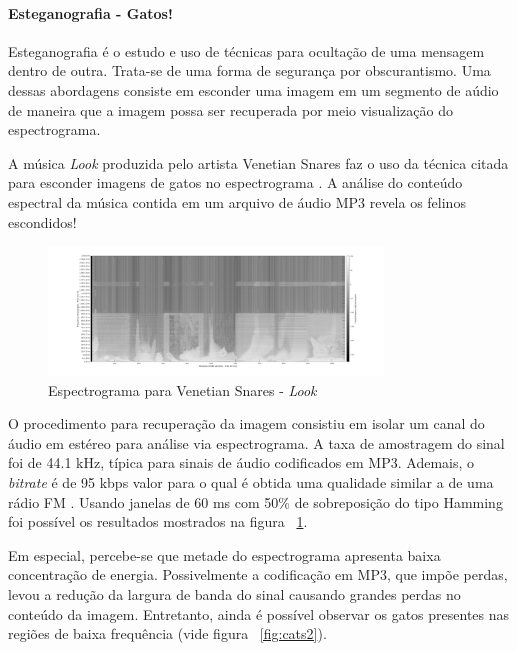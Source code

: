 \documentclass{article}
\begin{document}
\paragraph*{Esteganografia - Gatos!}
Esteganografia é o estudo e uso de técnicas para ocultação de uma mensagem dentro de outra. Trata-se de uma forma de segurança por obscurantismo. Uma dessas abordagens consiste em esconder uma imagem em um segmento de aúdio de maneira que a imagem possa ser recuperada por meio visualização do espectrograma.

A música \textit{Look} produzida pelo artista Venetian Snares faz o uso da técnica citada para esconder imagens de gatos no espectrograma \cite{ref:cats}. A análise do conteúdo espectral da música contida em um arquivo de áudio MP3 revela os felinos escondidos!
\begin{figure}[H]
	\begin{center}
		\includegraphics[width=3.5in]{Figures/cats.png}
		\caption{Espectrograma para Venetian Snares - \textit{Look}}
		\label{fig:cats}
	\end{center}
\end{figure}  

O procedimento para recuperação da imagem consistiu em isolar um canal do áudio em estéreo para análise via espectrograma. A taxa de amostragem do sinal foi de 44.1 kHz, típica para sinais de áudio codificados em MP3. Ademais, o \textit{bitrate} é de 95 kbps valor para o qual é obtida uma qualidade similar a de uma rádio FM \cite{ref:sayood}. Usando janelas de 60 ms com 50\% de sobreposição do tipo Hamming foi possível os resultados mostrados na figura ~\ref{fig:cats}.

Em especial, percebe-se que metade do espectrograma apresenta baixa concentração de energia. Possivelmente a codificação em MP3, que impõe perdas, levou a redução da largura de banda do sinal causando grandes perdas no conteúdo da imagem. Entretanto, ainda é possível observar os gatos presentes nas regiões de baixa frequência (vide figura ~\ref{fig:cats2}).
\end{document}
